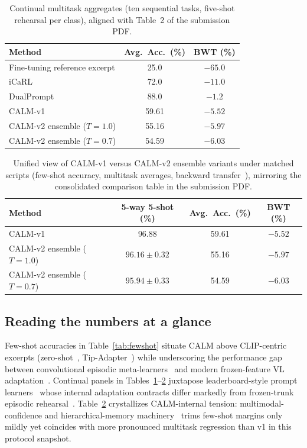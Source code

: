 \documentclass[12pt,a4paper]{report}
\begin{document}
\begin{table}[htbp]
  \centering
  \caption{Continual multitask aggregates (ten sequential tasks, five-shot rehearsal per class), aligned with Table~2 of the submission PDF.}
  \label{tab:cont}
  \begin{tabular}{lcc}
    \toprule
    Method & Avg.\ Acc.\ (\%) & BWT (\%) \\
    \midrule
    Fine-tuning reference excerpt & 25.0 & $-65.0$ \\
    iCaRL~\cite{r7} & 72.0 & $-11.0$ \\
    DualPrompt~\cite{r8} & 88.0 & $-1.2$ \\
    \midrule
    CALM-v1 & 59.61 & $-5.52$ \\
    CALM-v2 ensemble ($T{=}1.0$) & 55.16 & $-5.97$ \\
    CALM-v2 ensemble ($T{=}0.7$) & 54.59 & $-6.03$ \\
    \bottomrule
  \end{tabular}
\end{table}

\begin{table}[htbp]
  \centering
  \caption{Unified view of CALM-v1 versus CALM-v2 ensemble variants under matched scripts (few-shot accuracy, multitask averages, backward transfer~\cite{r19}), mirroring the consolidated comparison table in the submission PDF.}
  \label{tab:calm_main}
  \begin{tabular}{lccc}
    \toprule
    Method & 5-way 5-shot (\%) & Avg.\ Acc.\ (\%) & BWT (\%) \\
    \midrule
    CALM-v1 & 96.88 & 59.61 & $-5.52$ \\
    CALM-v2 ensemble ($T{=}1.0$) & $96.16 \pm 0.32$ & 55.16 & $-5.97$ \\
    CALM-v2 ensemble ($T{=}0.7$) & $95.94 \pm 0.33$ & 54.59 & $-6.03$ \\
    \bottomrule
  \end{tabular}
\end{table}

\subsection*{Reading the numbers at a glance}
Few-shot accuracies in Table~\ref{tab:fewshot} situate CALM above CLIP-centric excerpts (zero-shot~\cite{r1}, Tip-Adapter~\cite{r4}) while underscoring the performance gap between convolutional episodic meta-learners~\cite{r3} and modern frozen-feature VL adaptation~\cite{r1,r4}. Continual panels in Tables~\ref{tab:cont}--\ref{tab:calm_main} juxtapose leaderboard-style prompt learners~\cite{r8} whose internal adaptation contracts differ markedly from frozen-trunk episodic rehearsal~\cite{r7,r9}. Table~\ref{tab:calm_main} crystallizes CALM-internal tension: multimodal-confidence and hierarchical-memory machinery~\cite{r31,r21} trims few-shot margins only mildly yet coincides with more pronounced multitask regression than v1 in this protocol snapshot.
\end{document}
